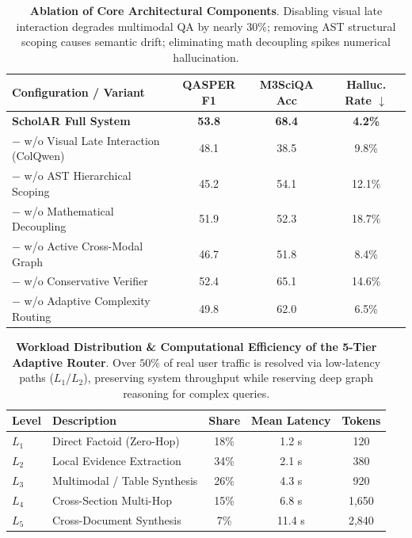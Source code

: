 \begin{table}[t]
\centering
\small
\begin{tabular}{lccc}
\toprule
\textbf{Configuration / Variant} & \textbf{QASPER F1} & \textbf{M3SciQA Acc} & \textbf{Halluc. Rate} $\downarrow$ \\
\midrule
\textbf{ScholAR Full System} & \textbf{53.8} & \textbf{68.4} & \textbf{4.2\%} \\
\midrule
\quad $-$ w/o Visual Late Interaction (ColQwen) & 48.1 & 38.5 & 9.8\% \\
\quad $-$ w/o AST Hierarchical Scoping & 45.2 & 54.1 & 12.1\% \\
\quad $-$ w/o Mathematical Decoupling & 51.9 & 52.3 & 18.7\% \\
\quad $-$ w/o Active Cross-Modal Graph & 46.7 & 51.8 & 8.4\% \\
\quad $-$ w/o Conservative Verifier & 52.4 & 65.1 & 14.6\% \\
\quad $-$ w/o Adaptive Complexity Routing & 49.8 & 62.0 & 6.5\% \\
\bottomrule
\end{tabular}
\caption{\textbf{Ablation of Core Architectural Components}. Disabling visual late interaction degrades multimodal QA by nearly $30\%$; removing AST structural scoping causes semantic drift; eliminating math decoupling spikes numerical hallucination.}
\label{tab:ablation}
\end{table}

\begin{table}[t]
\centering
\small
\begin{tabular}{llccc}
\toprule
\textbf{Level} & \textbf{Description} & \textbf{Share} & \textbf{Mean Latency} & \textbf{Tokens} \\
\midrule
$L_1$ & Direct Factoid (Zero-Hop) & 18\% & 1.2 s & 120 \\
$L_2$ & Local Evidence Extraction & 34\% & 2.1 s & 380 \\
$L_3$ & Multimodal / Table Synthesis & 26\% & 4.3 s & 920 \\
$L_4$ & Cross-Section Multi-Hop & 15\% & 6.8 s & 1,650 \\
$L_5$ & Cross-Document Synthesis & 7\% & 11.4 s & 2,840 \\
\bottomrule
\end{tabular}
\caption{\textbf{Workload Distribution & Computational Efficiency of the 5-Tier Adaptive Router}. Over $50\%$ of real user traffic is resolved via low-latency paths ($L_1$/$L_2$), preserving system throughput while reserving deep graph reasoning for complex queries.}
\label{tab:routing_efficiency}
\end{table}

